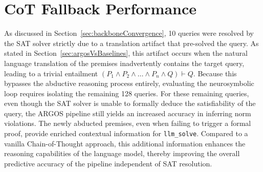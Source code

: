 \section{CoT Fallback Performance}
\label{sec:rq3Analysis}
As discussed in Section~\ref{sec:backboneConvergence}, 10 queries were resolved by the SAT solver strictly due to a translation artifact that pre-solved the query. As stated in Section~\ref{sec:argosVsBaselines}, this artifact occurs when the natural language translation of the premises inadvertently contains the target query, leading to a trivial entailment $(P_1 \land P_2 \land \dots \land P_n \land Q) \vdash Q$. Because this bypasses the abductive reasoning process entirely, evaluating the neurosymbolic loop requires isolating the remaining 128 queries. For these remaining queries, even though the SAT solver is unable to formally deduce the satisfiability of the query, the ARGOS pipeline still yields an increased accuracy in inferring norm violations. The newly abducted premises, even when failing to trigger a formal proof, provide enriched contextual information for \texttt{llm\_solve}. Compared to a vanilla Chain-of-Thought approach, this additional information enhances the reasoning capabilities of the language model, thereby improving the overall predictive accuracy of the pipeline independent of SAT resolution.
